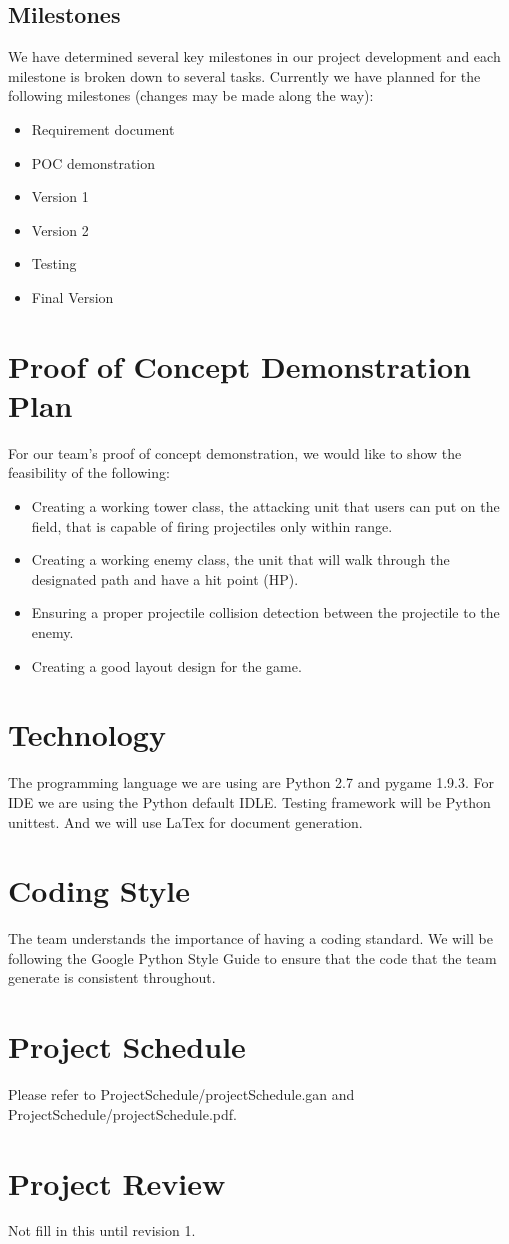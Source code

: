 \documentclass{article}
\begin{document}
\subsection{Milestones}
We have determined several key milestones in our project development and each milestone is broken down to several tasks. Currently we have planned for the following milestones (changes may be made along the way):
\begin{itemize}
    \item Requirement document
    \item POC demonstration
    \item Version 1
    \item Version 2
    \item Testing
    \item Final Version
\end{itemize}

\section{Proof of Concept Demonstration Plan}
For our team’s proof of concept demonstration, we would like to show the feasibility of the following:
\begin{itemize}
    \item Creating a working tower class, the attacking unit that users can put on the field,  that is capable of firing projectiles only within range.
    \item Creating a working enemy class, the unit that will walk through the designated path and have a hit point (HP).
    \item Ensuring a proper projectile collision detection between the projectile to the enemy.
    \item Creating a good layout design for the game.
\end{itemize}

\section{Technology}
The programming language we are using are Python 2.7 and pygame 1.9.3. For IDE we are using the Python default IDLE. Testing framework will be Python unittest. And we will use LaTex for document generation.

\section{Coding Style}
The team understands the importance of having a coding standard. We will be following the Google Python Style Guide to ensure that the code that the team generate is consistent throughout.

\section{Project Schedule}
Please refer to ProjectSchedule/projectSchedule.gan and ProjectSchedule/projectSchedule.pdf.

\section{Project Review}
Not fill in this until revision 1.
\end{document}
